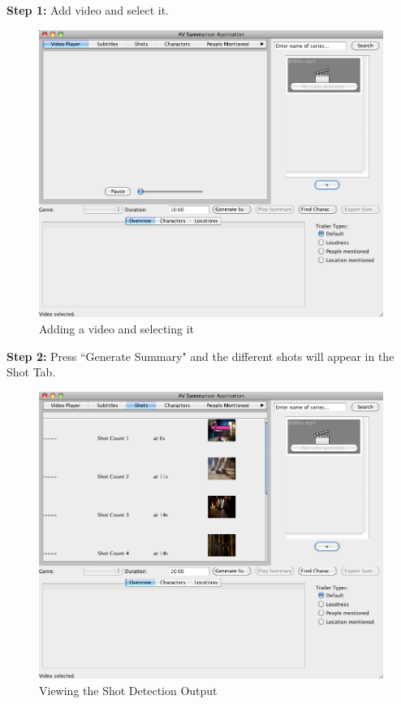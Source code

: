 \textbf{Step 1:} Add video and select it. 
\begin{figure}[ht]
\begin{center}
 \includegraphics[scale=0.31]{Images/ShotDetectionWalkthrough1.png}
  \caption{Adding a video and selecting it}
 \end{center}
\end{figure}

\textbf{Step 2:} Press ``Generate Summary" and the different shots will appear in the Shot Tab. 
\begin{figure}[ht]
\begin{center}
 \includegraphics[scale=0.31]{Images/ShotDetectionWalkthrough2.png}
  \caption{Viewing the Shot Detection Output}
 \end{center}
\end{figure}


